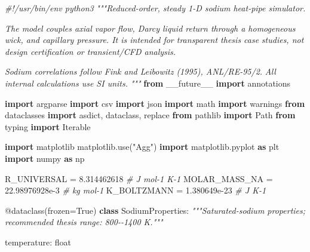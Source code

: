 \documentclass[
  12pt,
  12pt,a4paper,oneside]{report}
\newenvironment{Shaded}{}{}
\newcommand{\AttributeTok}[1]{\textcolor[rgb]{0.49,0.56,0.16}{#1}}
\newcommand{\BuiltInTok}[1]{\textcolor[rgb]{0.00,0.50,0.00}{#1}}
\newcommand{\CommentTok}[1]{\textcolor[rgb]{0.38,0.63,0.69}{\textit{#1}}}
\newcommand{\FloatTok}[1]{\textcolor[rgb]{0.25,0.63,0.44}{#1}}
\newcommand{\ImportTok}[1]{\textcolor[rgb]{0.00,0.50,0.00}{\textbf{#1}}}
\newcommand{\KeywordTok}[1]{\textcolor[rgb]{0.00,0.44,0.13}{\textbf{#1}}}
\newcommand{\NormalTok}[1]{#1}
\newcommand{\OperatorTok}[1]{\textcolor[rgb]{0.40,0.40,0.40}{#1}}
\newcommand{\StringTok}[1]{\textcolor[rgb]{0.25,0.44,0.63}{#1}}
\newcommand{\VariableTok}[1]{\textcolor[rgb]{0.10,0.09,0.49}{#1}}
\begin{document}
\begin{Shaded}
\begin{Highlighting}[]
\CommentTok{\#!/usr/bin/env python3}
\CommentTok{"""Reduced{-}order, steady 1{-}D sodium heat{-}pipe simulator.}

\CommentTok{The model couples axial vapor flow, Darcy liquid return through a homogeneous}
\CommentTok{wick, and capillary pressure. It is intended for transparent thesis case}
\CommentTok{studies, not design certification or transient/CFD analysis.}

\CommentTok{Sodium correlations follow Fink and Leibowitz (1995), ANL/RE{-}95/2.}
\CommentTok{All internal calculations use SI units.}
\CommentTok{"""}
\ImportTok{from}\NormalTok{ \_\_future\_\_ }\ImportTok{import}\NormalTok{ annotations}

\ImportTok{import}\NormalTok{ argparse}
\ImportTok{import}\NormalTok{ csv}
\ImportTok{import}\NormalTok{ json}
\ImportTok{import}\NormalTok{ math}
\ImportTok{import}\NormalTok{ warnings}
\ImportTok{from}\NormalTok{ dataclasses }\ImportTok{import}\NormalTok{ asdict, dataclass, replace}
\ImportTok{from}\NormalTok{ pathlib }\ImportTok{import}\NormalTok{ Path}
\ImportTok{from}\NormalTok{ typing }\ImportTok{import}\NormalTok{ Iterable}

\ImportTok{import}\NormalTok{ matplotlib}
\NormalTok{matplotlib.use(}\StringTok{"Agg"}\NormalTok{)}
\ImportTok{import}\NormalTok{ matplotlib.pyplot }\ImportTok{as}\NormalTok{ plt}
\ImportTok{import}\NormalTok{ numpy }\ImportTok{as}\NormalTok{ np}

\NormalTok{R\_UNIVERSAL }\OperatorTok{=} \FloatTok{8.314462618}  \CommentTok{\# J mol{-}1 K{-}1}
\NormalTok{MOLAR\_MASS\_NA }\OperatorTok{=} \FloatTok{22.98976928e{-}3}  \CommentTok{\# kg mol{-}1}
\NormalTok{K\_BOLTZMANN }\OperatorTok{=} \FloatTok{1.380649e{-}23}  \CommentTok{\# J K{-}1}


\AttributeTok{@dataclass}\NormalTok{(frozen}\OperatorTok{=}\VariableTok{True}\NormalTok{)}
\KeywordTok{class}\NormalTok{ SodiumProperties:}
    \CommentTok{"""Saturated{-}sodium properties; recommended thesis range: 800{-}{-}1400 K."""}

\NormalTok{    temperature: }\BuiltInTok{float}


\end{Highlighting}
\end{Shaded}
\end{document}
